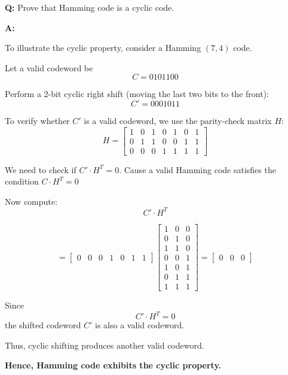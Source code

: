 \documentclass[11pt,a4paper]{book}
\newcounter{qna}[chapter]
\renewcommand{\theqna}{\thechapter.\arabic{qna}}
\newenvironment{questionanswerbox}[1][Example]{%
    \refstepcounter{qna}
    \begin{tcolorbox}[
        enhanced,
        breakable,
        colback=softlavender!10,
        colframe=softlavender!200,
        title={#1~\theqna},
        fonttitle=\bfseries,
        coltitle=white,
        colbacktitle=softlavender!200,
        sharp corners,
        boxrule=1pt,
        left=8pt,
        right=8pt,
        top=6pt,
        bottom=6pt
    ]
}{\end{tcolorbox}}
\begin{document}
\begin{questionanswerbox}[Hamming Code Is Cyclic Example]

\textbf{Q:} Prove that Hamming code is a cyclic code.

\textbf{A:}

To illustrate the cyclic property, consider a Hamming \((7,4)\) code.

Let a valid codeword be
\[
C = 0101100
\]

Perform a 2-bit cyclic right shift (moving the last two bits to the front):
\[
C' = 0001011
\]

To verify whether \(C'\) is a valid codeword, we use the parity-check matrix \(H\):
\[
H =
\begin{bmatrix}
1 & 0 & 1 & 0 & 1 & 0 & 1 \\
0 & 1 & 1 & 0 & 0 & 1 & 1 \\
0 & 0 & 0 & 1 & 1 & 1 & 1
\end{bmatrix}
\]

We need to check if \(C' \cdot H^T = 0\). Cause a valid Hamming code satisfies the condition \(C \cdot H^T = 0\)

Now compute:
\[
C' \cdot H^T
\]

\[
=
\begin{bmatrix}
0 & 0 & 0 & 1 & 0 & 1 & 1
\end{bmatrix}
\begin{bmatrix}
1 & 0 & 0 \\
0 & 1 & 0 \\
1 & 1 & 0 \\
0 & 0 & 1 \\
1 & 0 & 1 \\
0 & 1 & 1 \\
1 & 1 & 1
\end{bmatrix}
=
\begin{bmatrix}
0 & 0 & 0
\end{bmatrix}
\]

Since
\[
C' \cdot H^T = 0
\]
the shifted codeword \(C'\) is also a valid codeword.

Thus, cyclic shifting produces another valid codeword.

\textbf{Hence, Hamming code exhibits the cyclic property.}

\end{questionanswerbox}
\end{document}
